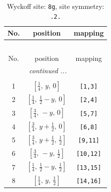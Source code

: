 \documentclass[fleqn,8pt]{jsarticle}
\begin{document}
\begin{longtable}{ccc}
\caption{Wyckoff site: {\tt 8g}, site symmetry: {\tt .2.}}
 \\
 \hline \hline
No. & position & mapping \\ \hline \endfirsthead

\multicolumn{2}{l}{\tablename\ \thetable{}} \\
 \hline \hline
No. & position & mapping \\ \hline \endhead

 \hline \hline
\multicolumn{2}{r}{\footnotesize\it continued ...} \\ \endfoot

 \hline \hline
\multicolumn{2}{r}{} \\ \endlastfoot

1 & $\left[ \frac{1}{4},\, y,\, 0 \right]$ & {\tt [1,3]} \\ \hline
2 & $\left[ \frac{1}{4},\, \frac{1}{2} - y,\, 0 \right]$ & {\tt [2,4]} \\ \hline
3 & $\left[ \frac{3}{4},\, - y,\, 0 \right]$ & {\tt [5,7]} \\ \hline
4 & $\left[ \frac{3}{4},\, y + \frac{1}{2},\, 0 \right]$ & {\tt [6,8]} \\ \hline
5 & $\left[ \frac{3}{4},\, y + \frac{1}{2},\, \frac{1}{2} \right]$ & {\tt [9,11]} \\ \hline
6 & $\left[ \frac{3}{4},\, - y,\, \frac{1}{2} \right]$ & {\tt [10,12]} \\ \hline
7 & $\left[ \frac{1}{4},\, \frac{1}{2} - y,\, \frac{1}{2} \right]$ & {\tt [13,15]} \\ \hline
8 & $\left[ \frac{1}{4},\, y,\, \frac{1}{2} \right]$ & {\tt [14,16]} \\
\end{longtable}
\renewcommand{\arraystretch}{1.2}
\end{document}
